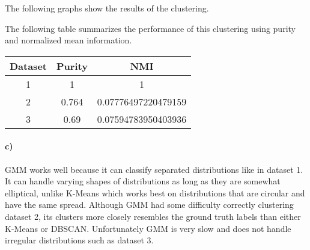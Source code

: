 \documentclass[12pt]{article}
\begin{document}
The following graphs show the results of the clustering.
\begin{center}
\end{center}
The following table summarizes the performance of this clustering using purity and normalized mean information.
\begin{center}
    \begin{tabular}{c|c|c}
        Dataset & Purity & NMI\\
        \hline
        1 & 1 & 1\\
        2 & 0.764 & 0.07776497220479159\\
        3 & 0.69 & 0.07594783950403936\\
    \end{tabular}
\end{center}

\paragraph{c)}

GMM works well because it can classify separated distributions like in dataset 1. It can handle varying shapes of distributions
as long as they are somewhat elliptical, unlike K-Means which works best on distributions that are circular and have the same spread.
Although GMM had some difficulty correctly clustering dataset 2, its clusters more closely resembles the ground truth labels than
either K-Means or DBSCAN. Unfortunately GMM is very slow and does not handle irregular distributions such as dataset 3.
\end{document}
